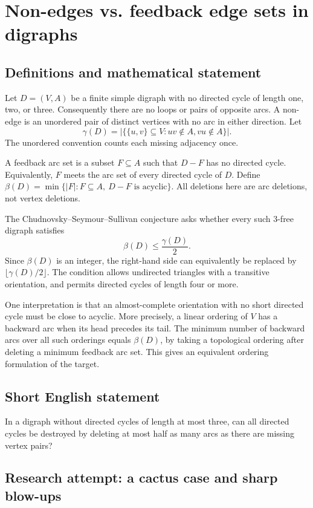 \documentclass[11pt,a4paper]{article}
\begin{document}
\section*{Non-edges vs. feedback edge sets in digraphs}\label{statement}

\subsection{Definitions and mathematical statement}
Let $D=(V,A)$ be a finite simple digraph with no directed cycle of length
one, two, or three. Consequently there are no loops or pairs of opposite
arcs. A non-edge is an unordered pair of distinct vertices with no arc
in either direction. Let
\[
 \gamma(D)=\bigl|\{\{u,v\}\subseteq V:uv\notin A, vu\notin A\}\bigr|.
\]
The unordered convention counts each missing adjacency once.

A feedback arc set is a subset $F\subseteq A$ such that $D-F$ has no
directed cycle. Equivalently, $F$ meets the arc set of every directed
cycle of $D$. Define
$\beta(D)=\min\{|F|:F\subseteq A,\ D-F\text{ is acyclic}\}$.
All deletions here are arc deletions, not vertex deletions.

The Chudnovsky--Seymour--Sullivan conjecture asks whether every such
3-free digraph satisfies
\[
                        \beta(D)\le\frac{\gamma(D)}2.
\]
Since $\beta(D)$ is an integer, the right-hand side can equivalently be
replaced by $\lfloor\gamma(D)/2\rfloor$. The condition allows undirected
triangles with a transitive orientation, and permits directed cycles
of length four or more.

One interpretation is that an almost-complete orientation with no short
directed cycle must be close to acyclic. More precisely, a linear ordering
of $V$ has a backward arc when its head precedes its tail. The minimum
number of backward arcs over all such orderings equals $\beta(D)$,
by taking a topological ordering after deleting a minimum feedback
arc set. This gives an equivalent ordering formulation of the target.
\subsection{Short English statement}
In a digraph without directed cycles of length at most three, can all directed cycles be destroyed by deleting at most half as many arcs as there are missing vertex pairs?
\subsection{Research attempt: a cactus case and sharp blow-ups}
\end{document}
